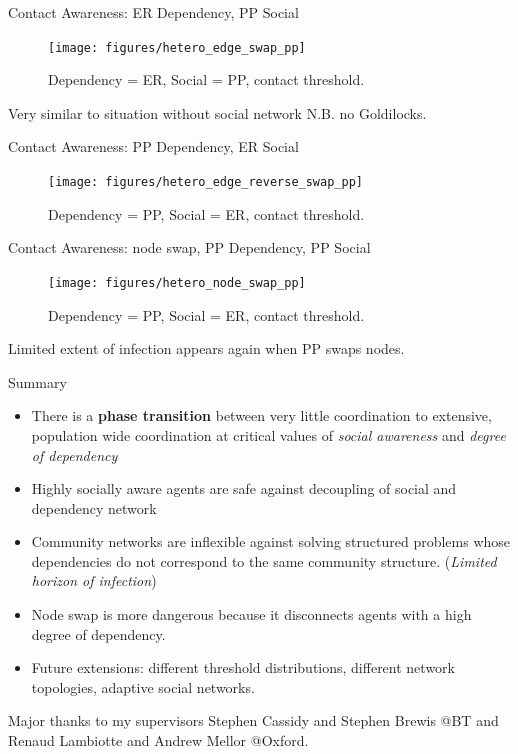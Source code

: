 \documentclass[10pt, xcolor=dvipsnames]{beamer}
\begin{document}
\begin{frame}{Contact Awareness: ER Dependency, PP Social}
\begin{figure}
\centering
\texttt{[image: figures/hetero\_edge\_swap\_pp]}
\caption{Dependency = ER, Social = PP, contact threshold.}
\end{figure}
Very similar to situation without social network N.B. no Goldilocks.

\end{frame}

\begin{frame}{Contact Awareness: PP Dependency, ER Social}
\begin{figure}
\centering
\texttt{[image: figures/hetero\_edge\_reverse\_swap\_pp]}
\caption{Dependency = PP, Social = ER, contact threshold.}
\end{figure}
\end{frame}


\begin{frame}{Contact Awareness: node swap, PP Dependency, PP Social}
\begin{figure}
\centering
\texttt{[image: figures/hetero\_node\_swap\_pp]}
\caption{Dependency = PP, Social = ER, contact threshold.}
\end{figure}
Limited extent of infection appears again when PP swaps nodes.
\end{frame}



\begin{frame}{Summary}
\begin{itemize}
\item There is a \textbf{phase transition} between very little coordination to extensive, population wide coordination at critical values of \emph{social awareness} and \emph{degree of dependency}
\item Highly socially aware agents are safe against decoupling of social and dependency network
\item Community networks are inflexible against solving structured problems whose dependencies do not correspond to the same community structure. (\emph{Limited horizon of infection})
\item Node swap is more dangerous because it disconnects agents with a high degree of dependency.
\item Future extensions: different threshold distributions, different network topologies, adaptive social networks.
\end{itemize}
\end{frame}

\begin{frame}[standout]
Major thanks to my supervisors Stephen Cassidy and Stephen Brewis @BT and Renaud Lambiotte and Andrew Mellor @Oxford.
\end{frame}
\begin{frame}[t,allowframebreaks]
\printbibliography
\end{frame}
\end{document}
